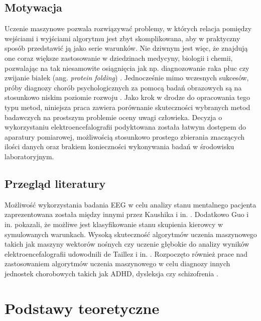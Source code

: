 \documentclass{./assets/wfis}
\begin{document}
\section{Motywacja}
Uczenie maszynowe pozwala rozwiązywać problemy, w których relacja pomiędzy wejściami i wyjściami algorytmu jest zbyt skomplikowana, aby w praktyczny sposób przedstawić ją jako serie warunków. Nie dziwnym jest więc, że znajdują one coraz większe zastosowanie w dziedzinach medycyny, biologii i chemii, pozwalając na tak niesamowite osiągnięcia jak np. diagnozowanie raka płuc \cite{li_machine_2022} czy zwijanie białek (ang. \textit{protein folding}) \cite{jumper_highly_2021}. Jednocześnie mimo wczesnych sukcesów, próby diagnozy chorób psychologicznych za pomocą badań obrazowych są na stosunkowo niskim poziomie rozwoju \cite{joshi_review_2021}. Jako krok w drodze do opracowania tego typu metod, niniejsza praca zawiera porównanie skuteczności wybranych metod badawczych na prostszym problemie oceny uwagi człowieka. Decyzja o wykorzystaniu elektroencefalografii podyktowana została łatwym dostępem do aparatury pomiarowej, możliwością stosunkowo prostego zbierania znaczących ilości danych oraz brakiem konieczności wykonywania badań w środowisku laboratoryjnym.

\section{Przegląd literatury}\label{literatura}
Możliwość wykorzystania badania EEG w celu analizy stanu mentalnego pacjenta zaprezentowana została między innymi przez Kaushika i in. \cite{kaushik_decoding_2022}. Dodatkowo Guo i in. \cite{guo_detection_2018} pokazali, że możliwe jest klasyfikowanie stanu skupienia kierowcy w symulowanych warunkach. Wysoką skuteczność algorytmów uczenia maszynowego takich jak maszyny wektorów nośnych czy uczenie głębokie do analizy wyników elektroencefalografii udowodnili de Taillez i in. \cite{de_taillez_machine_2020}. Rozpoczęto również prace nad zastosowaniem algorytmów uczenia maszynowego w celu diagnozy innych jednostek chorobowych takich jak ADHD, dysleksja czy schizofrenia \cite{ahire_comprehensive_2022, joshi_review_2021, clarke_eeg_2002}.

\chapter{Podstawy teoretyczne}
\end{document}
